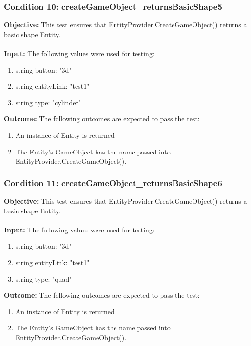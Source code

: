 \documentclass[a4paper,12pt]{article}
\begin{document}
		\subsubsection{Condition 10: createGameObject\_returnsBasicShape5}
			\textbf{Objective:} This test ensures that EntityProvider.CreateGameObject() returns a basic shape Entity.\\\\
			\textbf{Input:} The following values were used for testing:
				\begin{enumerate}
					\item string button: "3d"
					\item string entityLink: "test1"
					\item string type: "cylinder"
				\end{enumerate}
			\textbf{Outcome:} The following outcomes are expected to pass the test:
				\begin{enumerate}
					\item An instance of Entity is returned
					\item The Entity's GameObject has the name passed into EntityProvider.CreateGameObject().
				\end{enumerate}
		\subsubsection{Condition 11: createGameObject\_returnsBasicShape6}
			\textbf{Objective:} This test ensures that EntityProvider.CreateGameObject() returns a basic shape Entity.\\\\
			\textbf{Input:} The following values were used for testing:
				\begin{enumerate}
					\item string button: "3d"
					\item string entityLink: "test1"
					\item string type: "quad"
				\end{enumerate}
			\textbf{Outcome:} The following outcomes are expected to pass the test:
				\begin{enumerate}
					\item An instance of Entity is returned
					\item The Entity's GameObject has the name passed into EntityProvider.CreateGameObject().
				\end{enumerate}
\end{document}
